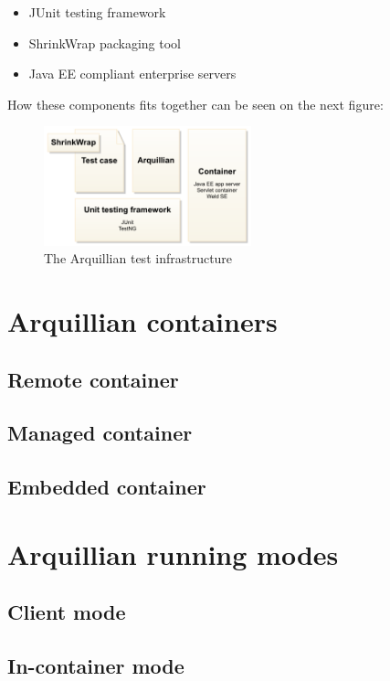 \documentclass[12pt,final,oneside]{fithesis}
\begin{document}
\begin{itemize}
\item{JUnit testing framework}
\item{ShrinkWrap packaging tool}
\item{Java EE compliant enterprise servers}
\end{itemize}

How these components fits together can be seen on the next figure:

\begin{figure}[!ht]
	\centering
	\includegraphics[width=60mm]{img/architecture-overview.png}
	\caption{The Arquillian test infrastructure}
	\label{fig:arquillian_test_infrastructure}
\end{figure}

	\section{Arquillian containers}
		\subsection{Remote container}
		\subsection{Managed container}
		\subsection{Embedded container}
		
	\section{Arquillian running modes}
		\subsection{Client mode}
		\subsection{In-container mode}
\end{document}
